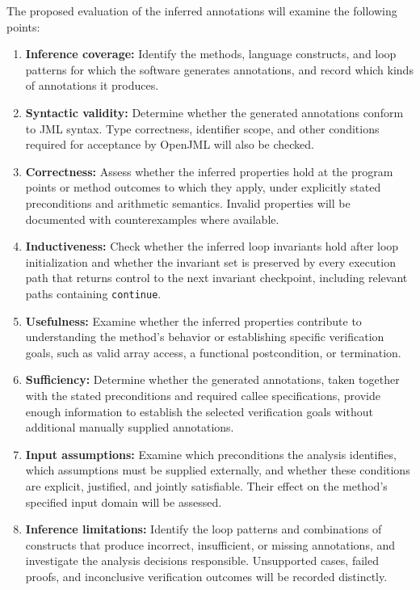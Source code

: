 \documentclass[11pt,a4paper]{article}
\begin{document}
The proposed evaluation of the inferred annotations will examine the following points:
\begin{enumerate}
\item \textbf{Inference coverage:} Identify the methods, language constructs, and loop patterns for which the software generates annotations, and record which kinds of annotations it produces.
\item \textbf{Syntactic validity:} Determine whether the generated annotations conform to JML syntax. Type correctness, identifier scope, and other conditions required for acceptance by OpenJML will also be checked.
\item \textbf{Correctness:} Assess whether the inferred properties hold at the program points or method outcomes to which they apply, under explicitly stated preconditions and arithmetic semantics. Invalid properties will be documented with counterexamples where available.
\item \textbf{Inductiveness:} Check whether the inferred loop invariants hold after loop initialization and whether the invariant set is preserved by every execution path that returns control to the next invariant checkpoint, including relevant paths containing \texttt{continue}.
\item \textbf{Usefulness:} Examine whether the inferred properties contribute to understanding the method's behavior or establishing specific verification goals, such as valid array access, a functional postcondition, or termination.
\item \textbf{Sufficiency:} Determine whether the generated annotations, taken together with the stated preconditions and required callee specifications, provide enough information to establish the selected verification goals without additional manually supplied annotations.
\item \textbf{Input assumptions:} Examine which preconditions the analysis identifies, which assumptions must be supplied externally, and whether these conditions are explicit, justified, and jointly satisfiable. Their effect on the method's specified input domain will be assessed.
\item \textbf{Inference limitations:} Identify the loop patterns and combinations of constructs that produce incorrect, insufficient, or missing annotations, and investigate the analysis decisions responsible. Unsupported cases, failed proofs, and inconclusive verification outcomes will be recorded distinctly.
\end{enumerate}
\end{document}
